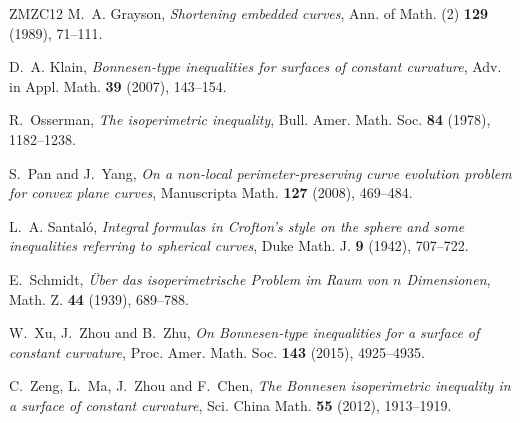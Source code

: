 \documentclass[11pt]{amsart}
\theoremstyle{definition}
\theoremstyle{remark}
\numberwithin{equation}{section}
\begin{document}
\begin{thebibliography}{ZMZC12}
M.~A. Grayson, \emph{Shortening embedded curves}, Ann. of Math. (2) \textbf{129} (1989), 71--111.

D.~A. Klain, \emph{Bonnesen-type inequalities for surfaces of constant curvature}, Adv. in Appl. Math. \textbf{39} (2007), 143--154.

R.~Osserman, \emph{The isoperimetric inequality}, Bull. Amer. Math. Soc. \textbf{84} (1978), 1182--1238.

S.~Pan and J.~Yang, \emph{On a non-local perimeter-preserving curve evolution problem for convex plane curves}, Manuscripta Math. \textbf{127} (2008), 469--484.

L.~A. Santal\'o, \emph{Integral formulas in Crofton's style on the sphere and some inequalities referring to spherical curves}, Duke Math. J. \textbf{9} (1942), 707--722.

E.~Schmidt, \emph{\"Uber das isoperimetrische Problem im Raum von $n$ Dimensionen}, Math. Z. \textbf{44} (1939), 689--788.

W.~Xu, J.~Zhou and B.~Zhu, \emph{On Bonnesen-type inequalities for a surface of constant curvature}, Proc. Amer. Math. Soc. \textbf{143} (2015), 4925--4935.

C.~Zeng, L.~Ma, J.~Zhou and F.~Chen, \emph{The Bonnesen isoperimetric inequality in a surface of constant curvature}, Sci. China Math. \textbf{55} (2012), 1913--1919.

\end{thebibliography}
\end{document}
